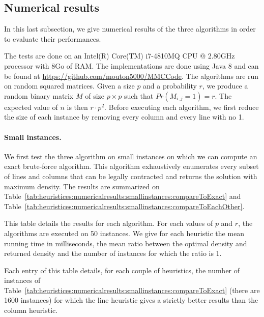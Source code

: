 \subsection{Numerical results}

In this last subsection, we give numerical results of the three algorithms in order to evaluate their performances.

The tests are done on an Intel(R) Core(TM) i7-4810MQ CPU @ 2.80GHz processor with 8Go of RAM. The implementations are done using Java 8 and can be found at \url{https://github.com/mouton5000/MMCCode}. The algorithms are run on random squared matrices. Given a size $p$ and a probability $r$, we produce a random binary matrix $M$ of size $p \times p$ such that $Pr(M_{i,j} = 1) = r$. The expected value of $n$ is then $r \cdot p^2$. Before executing each algorithm, we first reduce the size of each instance by removing every column and every line with no 1.

\paragraph{Small instances. }
We first test the three algorithm on small instances on which we can compute an exact brute-force algorithm. This algorithm exhaustively enumerates every subset of lines and columns that can be legally contracted and returns the solution with maximum density. The results are summarized on Table~\ref{tab:heuristices:numericalresults:smallinstances:compareToExact} and  Table~\ref{tab:heuristices:numericalresults:smallinstances:compareToEachOther}.


\begin{table}[ht!]
	\centering
	\def\arraystretch{1.2}
	\setlength\tabcolsep{0.075cm}
	
	\caption{This table details the results for each algorithm. For each values of $p$ and $r$, the algorithms are executed on 50 instances. We give for each heuristic the mean running time in milliseconds, the mean ratio between the optimal density and returned density and the number of instances for which the ratio is 1.}
	\label{tab:heuristices:numericalresults:smallinstances:compareToExact}
\end{table}

\begin{table}[ht!]
	\centering
	\def\arraystretch{1.2}
	\setlength\tabcolsep{0.075cm}
	
	\caption{Each entry of this table details, for each couple of heuristics, the number of instances of Table~\ref{tab:heuristices:numericalresults:smallinstances:compareToExact} (there are 1600 instances) for which the line heuristic gives a strictly better results than the column heuristic. }
	\label{tab:heuristices:numericalresults:smallinstances:compareToEachOther}
\end{table}

